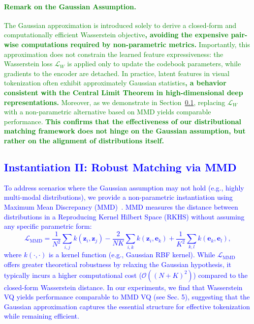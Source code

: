 \textcolor{green}{\paragraph{Remark on the Gaussian Assumption.} 
The Gaussian approximation is introduced solely to derive a closed-form and computationally efficient Wasserstein objective\textbf{, avoiding the expensive pair-wise computations required by non-parametric metrics.}
Importantly, this approximation does not constrain the learned feature expressiveness: the Wasserstein loss $\mathcal{L}_{W}$ is applied only to update the codebook parameters, while gradients to the encoder are detached. 
In practice, latent features in visual tokenization often exhibit approximately Gaussian statistics\textbf{, a behavior consistent with the Central Limit Theorem in high-dimensional deep representations.}
Moreover, as we demonstrate in Section~\ref{sec:mmd}, replacing $\mathcal{L}_{W}$ with a non-parametric alternative based on MMD yields comparable performance. 
\textbf{This confirms that the effectiveness of our distributional matching framework does not hinge on the Gaussian assumption, but rather on the alignment of distributions itself.}
}


\textcolor{blue}{\subsection{Instantiation II: Robust Matching via MMD}\label{sec:mmd}
To address scenarios where the Gaussian assumption may not hold (e.g., highly multi-modal distributions), we provide a non-parametric instantiation using Maximum Mean Discrepancy (MMD)~\citep{gretton2012kernel}. MMD measures the distance between distributions in a Reproducing Kernel Hilbert Space (RKHS) without assuming any specific parametric form:
\begin{equation}
\mathcal{L}_{\text{MMD}} = \frac{1}{N^2}\sum_{i,j} k(\bm{z}_i, \bm{z}_j) - \frac{2}{NK}\sum_{i,k} k(\bm{z}_i, \bm{e}_k) + \frac{1}{K^2}\sum_{k,l} k(\bm{e}_k, \bm{e}_l),
\end{equation}
where $k(\cdot, \cdot)$ is a kernel function (e.g., Gaussian RBF kernel). 
While $\mathcal{L}_{\text{MMD}}$ offers greater theoretical robustness by relaxing the Gaussian hypothesis, it typically incurs a higher computational cost ($\mathcal{O}((N+K)^2)$) compared to the closed-form Wasserstein distance. In our experiments, we find that Wasserstein VQ yields performance comparable to MMD VQ (see Sec. 5), suggesting that the Gaussian approximation captures the essential structure for effective tokenization while remaining efficient.
}

